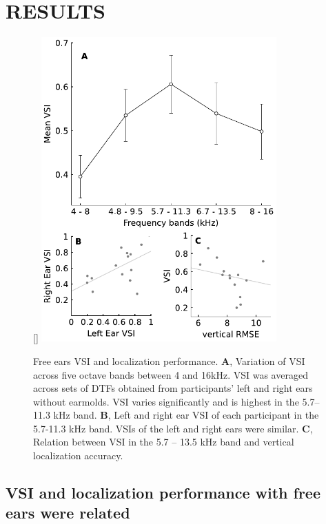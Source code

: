 \section{RESULTS}\label{sec3}%
\begin{figure}
\captionsetup{width=9cm}
\centering
    \raisebox{0pt}[\dimexpr{}\baselineskip\relax]{
        \includegraphics[width=9cm]{../Results/figures/fig2/fig2}}
	\caption{Free ears VSI and localization performance. \textbf{A}, Variation of VSI across five octave bands between 4 and 16kHz. VSI was averaged across sets of DTFs obtained from participants' left and right ears without earmolds. VSI varies significantly and is highest in the 5.7–11.3 kHz band.  \textbf{B}, Left and right ear VSI of each participant in the 5.7-11.3 kHz band. VSIs of the left and right ears were similar. \textbf{C}, Relation between VSI in the 5.7 – 13.5 kHz band and vertical localization accuracy.}
	\label{fig:ef_vsi}
\end{figure}
\noindent\vspace{-3\baselineskip}

\subsection{VSI and localization performance with free ears were related}

